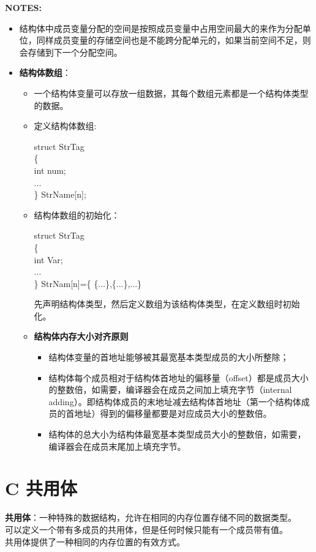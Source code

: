 \documentclass[UTF8]{ctexart}
\begin{document}
			\begin{framed}
				\textbf{NOTES:}
				\begin{itemize}
					\item 结构体中成员变量分配的空间是按照成员变量中占用空间最大的来作为分配单位，同样成员变量的存储空间也是不能跨分配单元的，如果当前空间不足，则会存储到下一个分配空间。
					\item \textbf{结构体数组}：\begin{itemize}
						\item 一个结构体变量可以存放一组数据，其每个数组元素都是一个结构体类型的数据。
						\item 定义结构体数组:\begin{framed}
							struct StrTag\\
							\{\\
								int num;\\
								...\\
							\} StrName[n];\\
						\end{framed}
						\item 结构体数组的初始化：\begin{framed}
							struct StrTag\\
							\{\\
								int Var;\\
								...\\
							\} StrNam[n]=\{ \{...\},\{...\},...\}
						\end{framed}先声明结构体类型，然后定义数组为该结构体类型，在定义数组时初始化。
						\item \textbf{结构体内存大小对齐原则}\begin{itemize}
							\item 结构体变量的首地址能够被其最宽基本类型成员的大小所整除；
							\item 结构体每个成员相对于结构体首地址的偏移量（offset）都是成员大小的整数倍，如需要，编译器会在成员之间加上填充字节（internal adding）。即结构体成员的末地址减去结构体首地址（第一个结构体成员的首地址）得到的偏移量都要是对应成员大小的整数倍。
							\item 结构体的总大小为结构体最宽基本类型成员大小的整数倍，如需要，编译器会在成员末尾加上填充字节。
						\end{itemize}
					\end{itemize}
				\end{itemize}
			\end{framed}

			\clearpage
			\section{C 共用体}
			\textbf{共用体}：一种特殊的数据结构，允许在相同的内存位置存储不同的数据类型。\\可以定义一个带有多成员的共用体，但是任何时候只能有一个成员带有值。\\共用体提供了一种相同的内存位置的有效方式。
\end{document}
